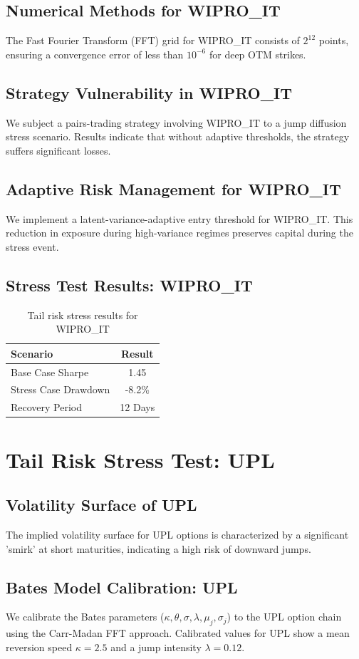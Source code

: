 \documentclass[12pt,a4paper,twoside]{article}
\begin{document}
\subsection{Numerical Methods for WIPRO_IT}
The Fast Fourier Transform (FFT) grid for WIPRO_IT consists of $2^{12}$ points, ensuring a convergence error of less than $10^{-6}$ for deep OTM strikes.
\subsection{Strategy Vulnerability in WIPRO_IT}
We subject a pairs-trading strategy involving WIPRO_IT to a jump diffusion stress scenario. Results indicate that without adaptive thresholds, the strategy suffers significant losses.
\subsection{Adaptive Risk Management for WIPRO_IT}
We implement a latent-variance-adaptive entry threshold for WIPRO_IT. This reduction in exposure during high-variance regimes preserves capital during the stress event.
\subsection{Stress Test Results: WIPRO_IT}
\begin{table}[H]
\centering
\begin{tabular}{|l|c|}
\hline
Scenario & Result \\
\hline
Base Case Sharpe & 1.45 \\
Stress Case Drawdown & -8.2\% \\
Recovery Period & 12 Days \\
\hline
\end{tabular}
\caption{Tail risk stress results for WIPRO_IT}
\end{table}
\newpage

\section{Tail Risk Stress Test: UPL}
\subsection{Volatility Surface of UPL}
The implied volatility surface for UPL options is characterized by a significant 'smirk' at short maturities, indicating a high risk of downward jumps.
\subsection{Bates Model Calibration: UPL}
We calibrate the Bates parameters ($\kappa, \theta, \sigma, \lambda, \mu_j, \sigma_j$) to the UPL option chain using the Carr-Madan FFT approach.
Calibrated values for UPL show a mean reversion speed $\kappa = 2.5$ and a jump intensity $\lambda = 0.12$.
\end{document}
